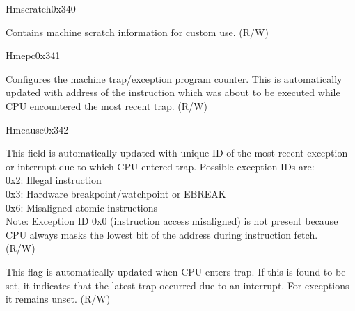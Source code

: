 \begin{register}{H}{mscratch}{0x340}\label{regdesc:LPMSCRATCH}
%
\regnewline%
\begin{regdesc}\begin{reglist}
\label{fielddesc:LPMSCRATCH}\item [MSCRATCH] Contains machine scratch information for custom use. (R/W)
\end{reglist}\end{regdesc}
\end{register}

\begin{register}{H}{mepc}{0x341}\label{regdesc:LPMEPC}
%
\regnewline%
\begin{regdesc}\begin{reglist}
\label{fielddesc:LPMEPC}\item [MEPC] Configures the machine trap/exception program counter. This is automatically updated with address of the instruction which was about to be executed while CPU encountered the most recent trap. (R/W)
\end{reglist}\end{regdesc}
\end{register}

\begin{register}{H}{mcause}{0x342}\label{regdesc:LPMCAUSE}
%
%
%
\regnewline%
\begin{regdesc}\begin{reglist}
\label{fielddesc:LPMCAUSECODE}\item [Exception Code] This field is automatically updated with unique ID of the most recent exception or interrupt due to which CPU entered trap. Possible exception IDs are:\\
0x2: Illegal instruction\\
0x3: Hardware breakpoint/watchpoint or EBREAK\\
0x6: Misaligned atomic instructions\\
Note: Exception ID 0x0 (instruction access misaligned) is not present because CPU always masks the lowest bit of the address during instruction fetch.\\
(R/W)
\label{fielddesc:LPMCAUSEINT}\item [Interrupt Flag] This flag is automatically updated when CPU enters trap. If this is found to be set, it indicates that the latest trap occurred due to an interrupt. For exceptions it remains unset.  (R/W)
\end{reglist}\end{regdesc}
\end{register}

